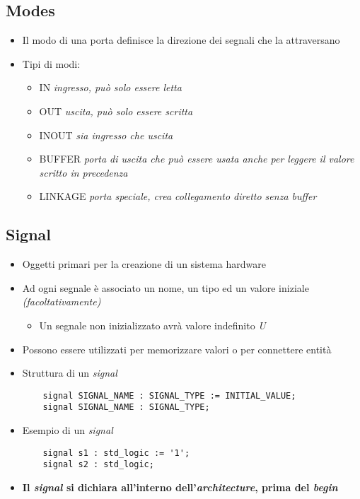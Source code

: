 \documentclass{article}
\begin{document}
\subsection{Modes}
\begin{itemize}
	\item Il modo di una porta definisce la direzione dei segnali che la attraversano
	\item Tipi di modi:
	      \begin{itemize}
	      	\item IN \textit{ingresso, può solo essere letta}
	      	\item OUT \textit{uscita, può solo essere scritta}
	      	\item INOUT \textit{sia ingresso che uscita}
	      	\item BUFFER \textit{porta di uscita che può essere usata anche per leggere il valore scritto in precedenza}
	      	\item LINKAGE \textit{porta speciale, crea collegamento diretto senza buffer}
	      \end{itemize}
\end{itemize}

\subsection{Signal}
\begin{itemize}
	\item Oggetti primari per la creazione di un sistema hardware
	\item Ad ogni segnale è associato un nome, un tipo ed un valore iniziale \textit{(facoltativamente)}
	      \begin{itemize}
	      	\item Un segnale non inizializzato avrà valore indefinito \textit{U}
	      \end{itemize}
	\item Possono essere utilizzati per memorizzare valori o per connettere entità
	\item Struttura di un \textit{signal}
	      \begin{verbatim}
    signal SIGNAL_NAME : SIGNAL_TYPE := INITIAL_VALUE;
    signal SIGNAL_NAME : SIGNAL_TYPE;
	      \end{verbatim}
	\item Esempio di un \textit{signal}
	      \begin{verbatim}
    signal s1 : std_logic := '1';
    signal s2 : std_logic;
	      \end{verbatim}
	\item \textbf{Il \textit{signal} si dichiara all'interno dell'\textit{architecture}, prima del \textit{begin}}
\end{itemize}
\end{document}
